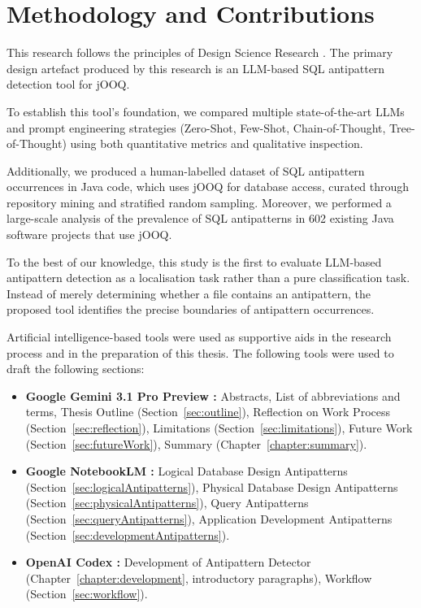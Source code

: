 \section{Methodology and Contributions}

This research follows the principles of Design Science Research . The primary design artefact produced by this research is an LLM-based SQL antipattern detection tool for jOOQ.

To establish this tool's foundation, we compared multiple state-of-the-art LLMs and prompt engineering strategies (Zero-Shot, Few-Shot, Chain-of-Thought, Tree-of-Thought) using both quantitative metrics and qualitative inspection.

Additionally, we produced a human-labelled dataset of SQL antipattern occurrences in Java code, which uses jOOQ for database access, curated through repository mining and stratified random sampling. Moreover, we performed a large-scale analysis of the prevalence of SQL antipatterns in \num{602} existing Java software projects that use jOOQ.

To the best of our knowledge, this study is the first to evaluate LLM-based antipattern detection as a localisation task rather than a pure classification task. Instead of merely determining whether a file contains an antipattern, the proposed tool identifies the precise boundaries of antipattern occurrences.

Artificial intelligence-based tools were used as supportive aids in the research process and in the preparation of this thesis. The following tools were used to draft the following sections:

\begin{itemize}
    \item \textbf{Google Gemini 3.1 Pro Preview :} Abstracts, List of abbreviations and terms, Thesis Outline (Section~\ref{sec:outline}), Reflection on Work Process (Section~\ref{sec:reflection}), Limitations (Section~\ref{sec:limitations}), Future Work (Section~\ref{sec:futureWork}), Summary (Chapter~\ref{chapter:summary}).
    \item \textbf{Google NotebookLM :} Logical Database Design Antipatterns (Section~\ref{sec:logicalAntipatterns}), Physical Database Design Antipatterns (Section~\ref{sec:physicalAntipatterns}), Query Antipatterns (Section~\ref{sec:queryAntipatterns}), Application Development Antipatterns (Section~\ref{sec:developmentAntipatterns}).
    \item \textbf{OpenAI Codex :} Development of Antipattern Detector (Chapter~\ref{chapter:development}, introductory paragraphs), Workflow (Section~\ref{sec:workflow}).
\end{itemize}

